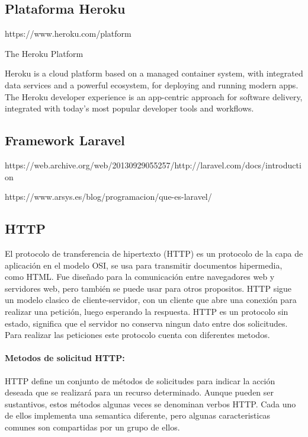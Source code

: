 \subsection{Plataforma Heroku}

https://www.heroku.com/platform


The Heroku Platform

Heroku is a cloud platform based on a managed container system, with integrated data services and a powerful ecosystem, for deploying and running modern apps. The Heroku developer experience is an app-centric approach for software delivery, integrated with today’s most popular developer tools and workflows.


\subsection{Framework Laravel}

https://web.archive.org/web/20130929055257/http://laravel.com/docs/introduction

https://www.arsys.es/blog/programacion/que-es-laravel/

\subsection{HTTP}

El protocolo de transferencia de hipertexto (HTTP) es un protocolo de la capa de aplicación en el modelo OSI, se usa para transmitir documentos hipermedia, como HTML. Fue diseñado para la comunicación entre navegadores web y servidores web, pero también se puede usar para otros propositos. HTTP sigue un modelo clasico de cliente-servidor, con un cliente que abre una conexión para realizar una petición, luego esperando la respuesta. HTTP es un protocolo sin estado, significa que el servidor no conserva ningun dato entre dos solicitudes. Para realizar las peticiones este protocolo cuenta con diferentes metodos.


\paragraph{Metodos de solicitud HTTP:}

HTTP define un conjunto de métodos de solicitudes para indicar la acción deseada que se realizará para un recurso determinado. Aunque pueden ser sustantivos, estos métodos algunas veces se denominan verbos HTTP. Cada uno de ellos implementa una semantica diferente, pero algunas caracteristicas comunes son compartidas por un grupo de ellos.\\



